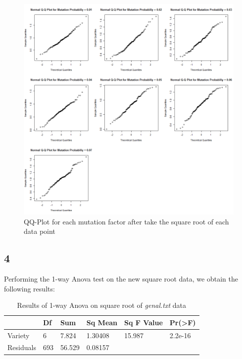 \documentclass{article}
\begin{document}
    \begin{figure}[H]
      \includegraphics[scale=0.4]{../results/3_3.png}
      \caption{QQ-Plot for each mutation factor after take the square root of each data point}
      \label{fig:qq-sqgenal}
    \end{figure}
    
    \subsection*{4}
    Performing the 1-way Anova test on the new square root data, we obtain the following results:
    \begin{table}[H]
    \begin{center}
    \begin{tabular}{l|lllll}
        \hline 
        & Df & Sum & Sq Mean & Sq F Value & Pr(>F) \\
        \hline
        Variety & 6 & 7.824 & 1.30408 & 15.987 & 2.2e-16 \\
        \hline
        Residuals & 693 & 56.529 & 0.08157\\
        \hline
    \end{tabular}
    \caption{Results of 1-way Anova on square root of \textit{genal.txt} data}
    \label{table:1anova}
    \end{center}
    \end{table}
    
\end{document}
